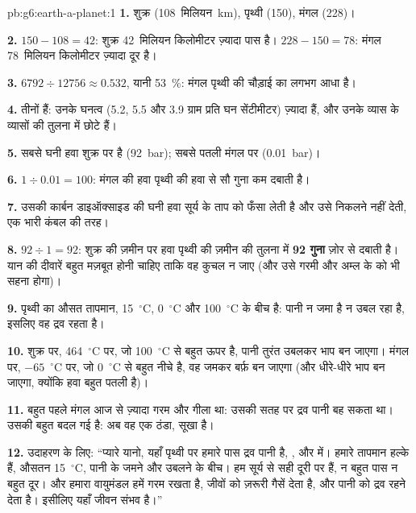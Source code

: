 \begin{solution}{pb:g6:earth-a-planet:1}
\textbf{1.} शुक्र (108~मिलियन~km), पृथ्वी (150), मंगल (228)।

\textbf{2.} $150 - 108 = 42$: शुक्र 42~मिलियन किलोमीटर ज़्यादा पास है।
$228 - 150 = 78$: मंगल 78~मिलियन किलोमीटर ज़्यादा दूर है।

\textbf{3.} $6792 \div 12756 \approx 0.532$, यानी 53~\%: मंगल पृथ्वी की
चौड़ाई का लगभग आधा है।

\textbf{4.} तीनों  हैं: उनके घनत्व (5.2, 5.5 और 3.9
ग्राम प्रति घन सेंटीमीटर) ज़्यादा हैं, और उनके व्यास  के व्यासों की
तुलना में छोटे हैं।

\textbf{5.} सबसे घनी हवा शुक्र पर है (92~bar); सबसे पतली मंगल पर
(0.01~bar)।

\textbf{6.} $1 \div 0.01 = 100$: मंगल की हवा पृथ्वी की हवा से सौ गुना
कम दबाती है।

\textbf{7.} उसकी कार्बन डाइऑक्साइड की घनी हवा सूर्य के ताप को फँसा लेती है और उसे
निकलने नहीं देती, एक भारी कंबल की तरह।

\textbf{8.} $92 \div 1 = 92$: शुक्र की ज़मीन पर हवा पृथ्वी की ज़मीन की तुलना में
\textbf{92 गुना} ज़ोर से दबाती है। यान की दीवारें बहुत मज़बूत होनी चाहिए ताकि वह
कुचल न जाए (और उसे गरमी और अम्ल के  को भी सहना
होगा)।

\textbf{9.} पृथ्वी का औसत तापमान, 15~$^\circ$C, 0~$^\circ$C और
100~$^\circ$C के बीच है: पानी न जमा है न उबल रहा है, इसलिए वह
द्रव रहता है।

\textbf{10.} शुक्र पर, 464~$^\circ$C पर, जो 100~$^\circ$C से बहुत ऊपर है, पानी
तुरंत उबलकर भाप बन जाएगा। मंगल पर, $-65$~$^\circ$C पर, जो
0~$^\circ$C से बहुत नीचे है, वह जमकर बर्फ़ बन जाएगा (और धीरे-धीरे भाप बन जाएगा,
क्योंकि हवा बहुत पतली है)।

\textbf{11.} बहुत पहले मंगल आज से ज़्यादा गरम और गीला था: उसकी सतह पर द्रव पानी
बह सकता था। उसकी  बहुत बदल गई है: अब वह
एक ठंडा, सूखा  है।

\textbf{12.} उदाहरण के लिए: ``प्यारे यानो, यहाँ पृथ्वी पर हमारे पास द्रव पानी है,
,  और  में। हमारे तापमान हल्के हैं, औसतन 15~$^\circ$C,
पानी के जमने और उबलने के बीच। हम सूर्य से सही दूरी पर हैं, न बहुत पास न बहुत
दूर। और हमारा वायुमंडल हमें गरम रखता है, जीवों को ज़रूरी गैसें देता है, और
पानी को द्रव रहने देता है। इसीलिए यहाँ जीवन संभव है।''
\end{solution}
